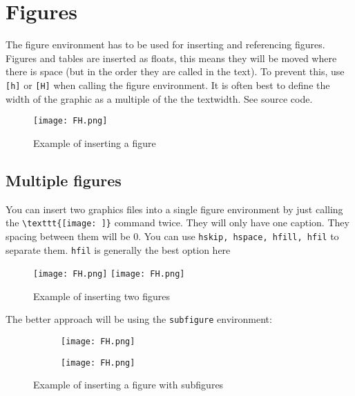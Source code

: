 \section{Figures}
\label{sec:Figures}
The figure environment has to be used for inserting and referencing figures. Figures and tables are inserted as floats, this means they will be moved where there is space (but in the order they are called in the text). To prevent this, use \texttt{[h]} or \texttt{[H]} when calling the figure environment.
It is often best to define the width of the graphic as a multiple of the the textwidth.
See source code.
\begin{figure}[h]
	\centering
	\texttt{[image: FH.png]}
	\caption{Example of inserting a figure}
	\label{fig:ExampleFigure-1}
\end{figure}

\subsection{Multiple figures}
You can insert two graphics files into a single figure environment by just calling the \verb|\texttt{[image: ]}| command twice. They will only have one caption. They spacing between them will be 0. You can use \texttt{hskip, hspace, hfill, hfil} to separate them. \texttt{hfil} is generally the best option here

\begin{figure}[h]
    \centering
    \texttt{[image: FH.png]}
    \hfil
    \texttt{[image: FH.png]}
    \caption{Example of inserting two figures}
    \label{fig:ExampleFigure-2}
\end{figure}

The better approach will be using the \verb|subfigure| environment:

\begin{figure}[h]
    \centering
    \begin{subfigure}{0.4\textwidth}
        \centering
        \texttt{[image: FH.png]}
    \end{subfigure}
    \hfil
    \begin{subfigure}{0.4\textwidth}
        \centering
        \texttt{[image: FH.png]}
    \end{subfigure}
    \caption{Example of inserting a figure with subfigures}
    \label{fig:ExampleFigure-3}
\end{figure}

